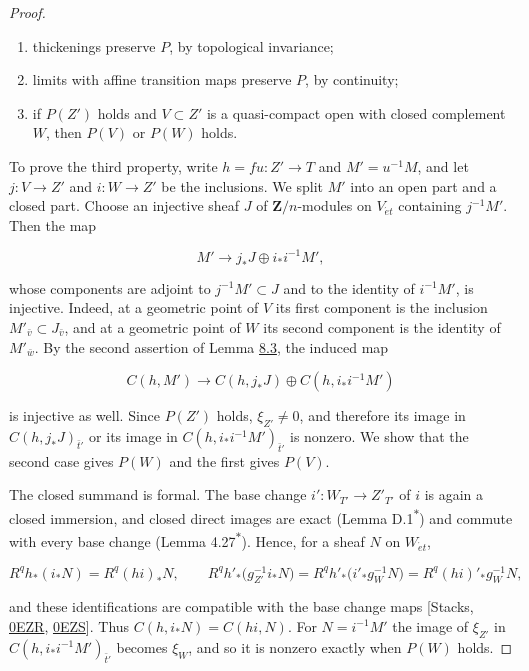 \documentclass[11pt]{article}
\newcommand{\bpout}[1]{#1\textsuperscript{\hyperlink{bp-outside}{\ensuremath{\ast}}}}
\begin{document}
\begin{proof}[{Proof}]
\begin{enumerate}
\item thickenings preserve \(P\), by topological invariance;
\item limits with affine transition maps preserve \(P\), by continuity;
\item if \(P(Z')\) holds and \(V\subset Z'\) is a quasi-compact open with closed complement \(W\), then \(P(V)\) or \(P(W)\) holds.
\end{enumerate}

To prove the third property, write \(h=fu:Z'\to T\) and \(M'=u^{-1}M\), and let \(j:V\to Z'\) and \(i:W\to Z'\) be the inclusions. We split \(M'\) into an open part and a closed part. Choose an injective sheaf \(J\) of \(\mathbf Z/n\)-modules on \(V_{\acute{e}t}\) containing \(j^{-1}M'\). Then the map

\[
M'\longrightarrow j_*J\oplus i_*i^{-1}M',
\]

whose components are adjoint to \(j^{-1}M'\subset J\) and to the identity of \(i^{-1}M'\), is injective. Indeed, at a geometric point of \(V\) its first component is the inclusion \(M'_{\bar v}\subset J_{\bar v}\), and at a geometric point of \(W\) its second component is the identity of \(M'_{\bar w}\). By the second assertion of Lemma \hyperref[bp17]{8.3}, the induced map

\[
C(h,M')\longrightarrow C(h,j_*J)\oplus C(h,i_*i^{-1}M')
\]

is injective as well. Since \(P(Z')\) holds, \(\xi_{Z'}\neq0\), and therefore its image in \(C(h,j_*J)_{\bar t'}\) or its image in \(C(h,i_*i^{-1}M')_{\bar t'}\) is nonzero. We show that the second case gives \(P(W)\) and the first gives \(P(V)\).

The closed summand is formal. The base change \(i':W_{T'}\to Z'_{T'}\) of \(i\) is again a closed immersion, and closed direct images are exact (Lemma \bpout{D.1}) and commute with every base change (Lemma \bpout{4.27}). Hence, for a sheaf \(N\) on \(W_{\acute{e}t}\),

\[
R^qh_*(i_*N)=R^q(hi)_*N,
\qquad
R^qh'_*\bigl(g_{Z'}^{-1}i_*N\bigr)=R^qh'_*\bigl(i'_*g_W^{-1}N\bigr)
=R^q(hi)'_*g_W^{-1}N,
\]

and these identifications are compatible with the base change maps [Stacks, \href{https://stacks.math.columbia.edu/tag/0EZR}{0EZR}, \href{https://stacks.math.columbia.edu/tag/0EZS}{0EZS}]. Thus \(C(h,i_*N)=C(hi,N)\). For \(N=i^{-1}M'\) the image of \(\xi_{Z'}\) in \(C(h,i_*i^{-1}M')_{\bar t'}\) becomes \(\xi_W\), and so it is nonzero exactly when \(P(W)\) holds.


\end{proof}
\end{document}
